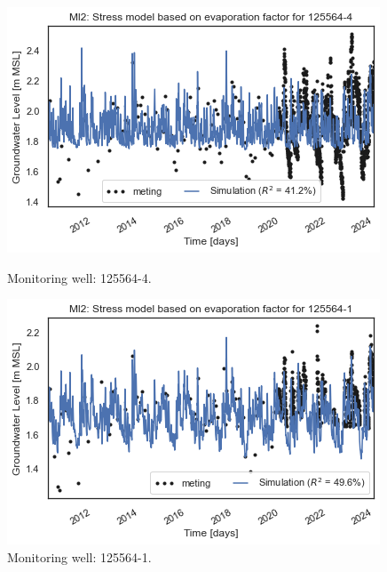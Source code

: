 \begin{figure}[htbp]
    \centering
    \begin{minipage}{0.32\textwidth}
        \centering
        \includegraphics[width=\linewidth]{frontmatter/Heijplaat-fig/125564-4.png}
        \caption{Monitoring well: 125564-4.}
        \label{SM: 125563-114}
    \end{minipage}
    \hfill
    \begin{minipage}{0.32\textwidth}
        \centering
        \includegraphics[width=\linewidth]{frontmatter/Heijplaat-fig/1255641.png}
        \caption{Monitoring well: 125564-1.}
        \label{SM: 125563-115}
    \end{minipage}
\end{figure}
